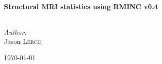 \begin{titlepage}
 
\begin{center}
 
 
 
 
 
 
\HRule \\[0.4cm]
{ \huge \bfseries Structural MRI statistics using RMINC v0.4}\\[0.4cm]
 
\HRule \\[1.5cm]
 
\begin{minipage}{0.4\textwidth}
\begin{center}
\emph{Author:}\\
Jason \textsc{Lerch}
\end{center}
\end{minipage}
 
\vfill
 
{\large \today}
 
\end{center}
 
\end{titlepage}
